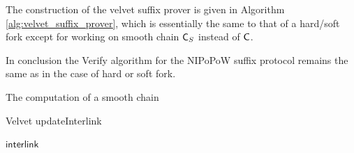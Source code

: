 The construction of the velvet suffix prover is given in Algorithm \ref{alg:velvet_suffix_prover}, which is essentially the same to that of a hard/soft fork except for working on smooth chain $\mathsf{C}_S$ instead of $\mathsf{C}$.

In conclusion the Verify algorithm for the NIPoPoW suffix protocol remains the same as in the case of hard or soft fork.

\begin{algorithm}[H]
	\caption{\label{alg:smooth_chain}The computation of a smooth chain}
	\begin{algorithmic}[1]
						\EndIf
				\EndWhile
				\State{}
			\EndFunction
	\end{algorithmic}
	\vspace{4mm}
	\begin{algorithmic}[1]
					\State\Return{$\true$}
				\EndIf
							\State\Return{$\false$}
						\EndIf
				\EndFor
				\State\Return{$\true$}
			\EndFunction
	\end{algorithmic}
	\vspace{4mm}
	\begin{algorithmic}[1]
							\State\Return{$\false$}
						\EndIf
							\State\Return{$\false$}
						\EndIf
				\EndWhile
				\State{}
			\EndFunction
	\end{algorithmic}
\end{algorithm}

\begin{algorithm}[h!]
		\caption{\label{alg:updateInterlink}Velvet updateInterlink}
		\begin{algorithmic}[1]
						\EndFor
						\State\Return$\textsf{interlink}$
				\EndFunction
		\end{algorithmic}
\end{algorithm}

